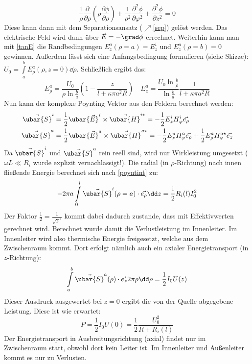 		  		$$
		  		\frac{1}{\rho}\frac{\partial}{\partial \rho}\left(\rho\frac{\partial \phi}{\partial \rho}\right) + \frac{1}{\rho^2}\frac{\partial^2 \phi}{\partial \varphi^2} + \frac{\partial^2 \phi}{\partial z^2} =0 
		  		$$
		  		Diese kann dann mit dem Separationsansatz ($\nearrow$\ref{sep}) gelöst werden. Das elektrische Feld wird dann über $\vec{E}=-\grad \phi$ errechnet. Weiterhin kann man mit \ref{tanE} die Randbedingungen $E_z^a(\rho=a) = E_z^i$ und $E_z^a(\rho=b) = 0$ gewinnen. Außerdem lässt sich eine Anfangsbedingung formulieren (siehe Skizze): $U_0=\int\limits_a^b E^a_\rho(\rho, z=0)\dd\rho$.
Schließlich ergibt das:
		  	$$
		  	E_\rho^a = \frac{U_0}{\rho \ln\frac{b}{a}}\left(1-\frac{z}{l+\kappa\pi a^2 R}\right) \quad E_z^a = \frac{U_0 \ln\frac{b}{\rho}}{\ln\frac{b}{a}}\frac{1}{l+\kappa\pi a^2 R}
		  	$$
Nun kann der komplexe Poynting Vektor aus den Feldern berechnet werden:
		  	\begin{equation*}\begin{split}
		  			\vec{\ubar{S}}^i &= \frac{1}{2} \ubar{\vec{E}}^i \times \vec{\ubar{H}}^{i\star} = -\frac{1}{2} E_z^i H_\varphi^i \vec{e_\rho}\\
		  			\vec{\ubar{S}}^a &=\frac{1}{2} \ubar{\vec{E}}^a \times \vec{\ubar{H}}^{a\star} = -\frac{1}{2} E_z^a H_\varphi^a \vec{e_\rho} + \frac{1}{2} E_\rho^a H_\varphi^{a\star} \vec{e_z}
		  	\end{split}\end{equation*}
		  Da $\vec{\ubar{S}}^i$ und $\vec{\ubar{S}}^a$ rein reell sind, wird nur Wirkleistung umgesetzt ($\omega L\ll R_i$ wurde explizit vernachlässigt!). Die radial (in $\rho$-Richtung) nach innen fließende Energie berechnet sich nach \ref{poyntint} zu:
		  	$$
		  	- 2\pi a \int\limits_0^l \vec{\ubar{S}}^i (\rho=a)\cdot\vec{e_\rho} \dd z = \frac{1}{2} R_i(l) I_0^2 
		  	$$
		  	Der Faktor $\frac{1}{2}=\frac{1}{\sqrt{2}^2}$ kommt dabei dadurch zustande, dass mit Effektivwerten gerechnet wird. Berechnet wurde damit die Verlustleistung im Innenleiter. Im Innenleiter wird also thermische Energie freigesetzt, welche aus dem Zwischenraum kommt. Dort erfolgt nämlich auch ein axialer Energietransport (in $z$-Richtung):
		  	$$
		  	\int\limits_a^b \vec{\ubar{S}}^a (\rho) \cdot\vec{e_z} 2 \pi\rho\dd\rho = \frac{1}{2} I_0 U(z)
		  	$$
		  	 Dieser Ausdruck ausgewertet bei $z=0$ ergibt die von der Quelle abgegebene Leistung. Diese ist wie erwartet:
		  	$$
		  	P = \frac{1}{2} I_0U(0) = \frac{1}{2} \frac{U_0^2}{R+R_i(l)}
		  	$$
Der Energietransport in Ausbreitungsrichtung (axial) findet nur im Zwischenraum statt, obwohl dort kein Leiter ist. Im Innenleiter und Außenleiter kommt es nur zu Verlusten.
